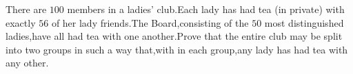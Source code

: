 There are $100$ members in a ladies' club.Each lady has had tea (in private) with exactly $56$ of her lady friends.The Board,consisting of the  $50$ most distinguished ladies,have all had tea with one another.Prove that the entire club may be split into two groups in such a way that,with in each group,any lady has had tea with any other.